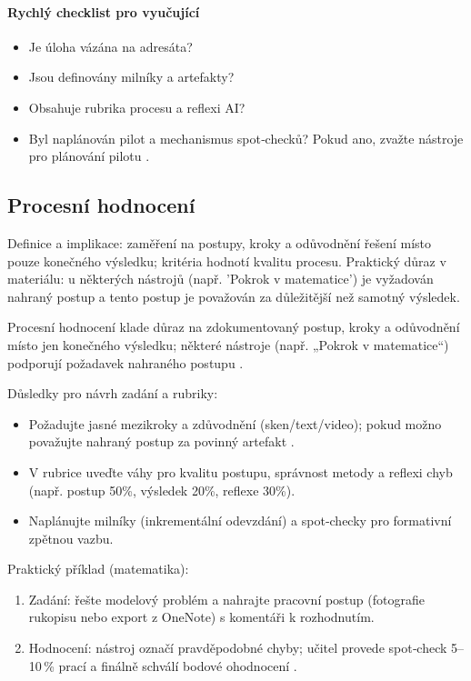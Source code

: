 \documentclass{report}%
\begin{document}
\paragraph{Rychlý checklist pro vyučující}
\begin{itemize}
  \item Je úloha vázána na adresáta? \item Jsou definovány milníky a artefakty? \item Obsahuje rubrika procesu a reflexi AI? \item Byl naplánován pilot a mechanismus spot‑checků? Pokud ano, zvažte nástroje pro plánování pilotu \cite{kb_ai_101_tipu_pdf_04e4a115_page_48_1}.
\end{itemize}%

%
\subsection{Procesní hodnocení}%
Definice a implikace: zaměření na postupy, kroky a odůvodnění řešení místo pouze konečného výsledku; kritéria hodnotí kvalitu procesu. Praktický důraz v materiálu: u některých nástrojů (např. 'Pokrok v matematice') je vyžadován nahraný postup a tento postup je považován za důležitější než samotný výsledek.%


%
Procesní hodnocení klade důraz na zdokumentovaný postup, kroky a odůvodnění místo jen konečného výsledku; některé nástroje (např. „Pokrok v matematice“) podporují požadavek nahraného postupu \cite{kb_ai_101_tipu_pdf_04e4a115_page_8_1}.

Důsledky pro návrh zadání a rubriky:
\begin{itemize}
  \item Požadujte jasné mezikroky a zdůvodnění (sken/text/video); pokud možno považujte nahraný postup za povinný artefakt \cite{kb_ai_101_tipu_pdf_04e4a115_page_8_1}.
  \item V rubrice uveďte váhy pro kvalitu postupu, správnost metody a reflexi chyb (např. postup 50\%, výsledek 20\%, reflexe 30\%).
  \item Naplánujte milníky (inkrementální odevzdání) a spot‑checky pro formativní zpětnou vazbu.
\end{itemize}

Praktický příklad (matematika):
\begin{enumerate}\item Zadání: řešte modelový problém a nahrajte pracovní postup (fotografie rukopisu nebo export z OneNote) s komentáři k rozhodnutím.\item Hodnocení: nástroj označí pravděpodobné chyby; učitel provede spot‑check 5–10\,\% prací a finálně schválí bodové ohodnocení \cite{kb_ai_101_tipu_pdf_04e4a115_page_8_1}.\end{enumerate}
\end{document}
